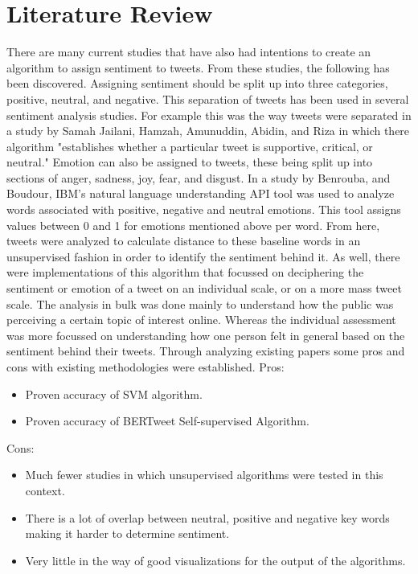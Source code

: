 \documentclass[conference]{IEEEtran}
\begin{document}
\section{Literature Review}
There are many current studies that have also had intentions to create an algorithm to assign sentiment to tweets.  
From these studies, the following has been discovered.
Assigning sentiment should be split up into three categories, positive, neutral, and negative.
This separation of tweets has been used in several sentiment analysis studies.
For example this was the way tweets were separated in a study by Samah Jailani, Hamzah, Amunuddin, Abidin, and Riza in which there algorithm "establishes whether a particular tweet is supportive, critical, or neutral\cite{b2}."
Emotion can also be assigned to tweets, these being split up into sections of anger, sadness, joy, fear, and disgust. 
In a study by Benrouba, and Boudour, IBM's natural language understanding API tool was used to analyze words associated with positive, negative and neutral emotions\cite{b1}.
This tool assigns values between 0 and 1 for emotions mentioned above per word. 
From here, tweets were analyzed to calculate distance to these baseline words in an unsupervised fashion in order to identify the sentiment behind it. 
As well, there were implementations of this algorithm that focussed on deciphering the sentiment or emotion of a tweet on an individual scale, or on a more mass tweet scale.
The analysis in bulk was done mainly to understand how the public was perceiving a certain topic of interest online. 
Whereas the individual assessment was more focussed on understanding how one person felt in general based on the sentiment behind their tweets. 
Through analyzing existing papers some pros and cons with existing methodologies were established. \newline
\newline
Pros: 
\begin{itemize}
    \item Proven accuracy of SVM algorithm.
    \item Proven accuracy of BERTweet Self-supervised Algorithm.
\end{itemize}
Cons:
\begin{itemize}
    \item Much fewer studies in which unsupervised algorithms were tested in this context.
    \item There is a lot of overlap between neutral, positive and negative key words making it harder to determine sentiment.
    \item Very little in the way of good visualizations for the output of the algorithms.
\end{itemize}
\end{document}
